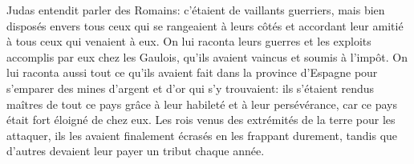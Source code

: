 Judas entendit parler des Romains:
	c’étaient de vaillants guerriers,
		mais bien disposés envers tous ceux qui se rangeaient à leurs côtés
	et accordant leur amitié à tous ceux qui venaient à eux.
On lui raconta leurs guerres et les exploits accomplis par eux chez les Gaulois,
	qu’ils avaient vaincus et soumis à l’impôt.
On lui raconta aussi tout ce qu’ils avaient fait dans la province d’Espagne
	pour s’emparer des mines d’argent et d’or qui s’y trouvaient:
	ils s’étaient rendus maîtres de tout ce pays
		grâce à leur habileté et à leur persévérance,
	car ce pays était fort éloigné de chez eux.
Les rois venus des extrémités de la terre pour les attaquer,
	ils les avaient finalement écrasés en les frappant durement,
	tandis que d’autres devaient leur payer un tribut chaque année.
